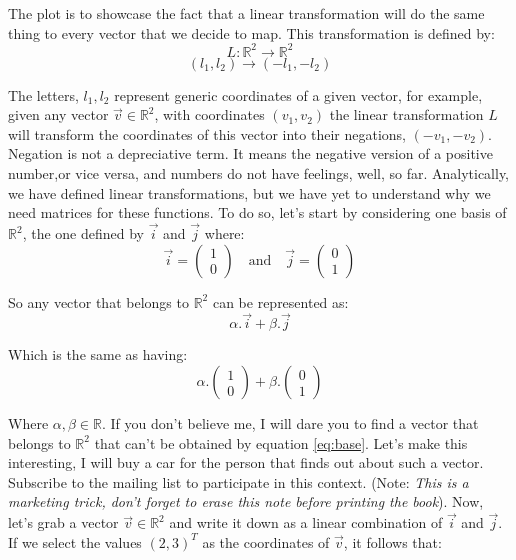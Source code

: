 \documentclass[a4,12pt,twosided,openany]{memoir}
\begin{document}
\par 
\indent
The plot is to showcase the fact that a linear transformation will do the same thing to every vector that we decide to map. This transformation is defined by:
\[L:\mathbb{R}^2 \rightarrow \mathbb{R}^2\]
\[(l_1,l_2) \rightarrow (-l_1, -l_2) \]
\par 
\indent
The letters, $l_1,l_2$ represent generic coordinates of a given vector, for example, given any vector  $\overrightarrow{v} \in \mathbb{R}^2$, with coordinates $(v_1,v_2)$ the linear transformation $L$ will transform the coordinates of this vector into their negations, $(-v_1,-v_2)$. Negation is not a depreciative term. It means the negative version of a positive number,or vice versa, and numbers do not have feelings, well, so far. Analytically, we have defined linear transformations, but we have yet to understand why we need matrices for these functions. To do so, let’s start by considering one basis of $\mathbb{R}^2$, the one defined by $\overrightarrow{i}$ and $\overrightarrow{j}$ where:
\[\overrightarrow{i} =\begin{pmatrix}
 1 \\
 0
 \end{pmatrix}\quad \textrm{and} \quad  \overrightarrow{j} =\begin{pmatrix}
 0 \\
 1
 \end{pmatrix}\]
\par 
\indent
So any vector that belongs to $\mathbb{R}^2$ can be represented as:
\[\alpha.\overrightarrow{i} + \beta.\overrightarrow{j} \]
\par 
\indent
Which is the same as having:
\begin{equation}\label{eq:base}
\alpha.\begin{pmatrix}
 1 \\
 0
 \end{pmatrix} + \beta.\begin{pmatrix}
 0 \\
 1
 \end{pmatrix}
\end{equation}
\par 
\indent
Where $\alpha, \beta  \in \mathbb{R}$. If you don’t believe me, I will dare you to find a vector that belongs to $\mathbb{R}^2$ that can’t be obtained by equation \ref{eq:base}. Let's make this interesting, I will buy a car for the person that finds out about such a vector. Subscribe to the mailing list to participate in this context. (Note: \textit{This is a marketing trick, don't forget to erase this note before printing the book}). Now, let’s grab a vector  $\overrightarrow{v} \in \mathbb{R}^2$ and write it down as a linear combination of $\overrightarrow{i}$ and $\overrightarrow{j}$. If we select the values $(2,3)^T$ as the coordinates of $\overrightarrow{v}$, it follows that:
\end{document}

